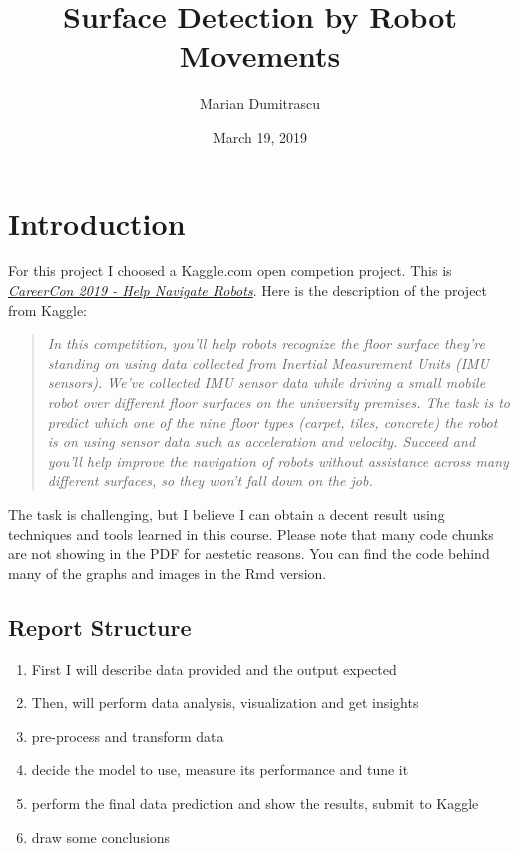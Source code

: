\documentclass[]{article}
\title{Surface Detection by Robot Movements}
\author{Marian Dumitrascu}
\date{March 19, 2019}
\providecommand{\tightlist}{%
  \setlength{\itemsep}{0pt}\setlength{\parskip}{0pt}}
\begin{document}
\maketitle

\hypertarget{introduction}{%
\section{Introduction}\label{introduction}}

For this project I choosed a Kaggle.com open competion project. This is
\href{https://www.kaggle.com/c/career-con-2019}{\emph{CareerCon 2019 -
Help Navigate Robots}}. Here is the description of the project from
Kaggle:

\begin{quote}
\emph{In this competition, you'll help robots recognize the floor
surface they're standing on using data collected from Inertial
Measurement Units (IMU sensors).} \emph{We've collected IMU sensor data
while driving a small mobile robot over different floor surfaces on the
university premises. The task is to predict which one of the nine floor
types (carpet, tiles, concrete) the robot is on using sensor data such
as acceleration and velocity. Succeed and you'll help improve the
navigation of robots without assistance across many different surfaces,
so they won't fall down on the job.}
\end{quote}

The task is challenging, but I believe I can obtain a decent result
using techniques and tools learned in this course. Please note that many
code chunks are not showing in the PDF for aestetic reasons. You can
find the code behind many of the graphs and images in the Rmd version.

\hypertarget{report-structure}{%
\subsection{Report Structure}\label{report-structure}}

\begin{enumerate}
\def\labelenumi{\arabic{enumi}.}
\tightlist
\item
  First I will describe data provided and the output expected
\item
  Then, will perform data analysis, visualization and get insights
\item
  pre-process and transform data
\item
  decide the model to use, measure its performance and tune it
\item
  perform the final data prediction and show the results, submit to
  Kaggle
\item
  draw some conclusions
\end{enumerate}
\end{document}
